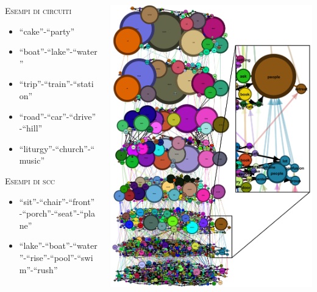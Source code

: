 \begin{minipage}[t]{\textwidth}
    \vspace{-0.4cm}
    \begin{columns}
    \begin{column}{0.33\textwidth}
        {\color{orangeUnicam} \scshape \small Esempi di circuiti}
        {\tiny
        \begin{itemize}
            \item “cake”-“party”
            \item “boat”-“lake”-“water”
            \item “trip”-“train”-“station”
            \item “road”-“car”-“drive”-“hill”
            \item “liturgy”-“church”-“music”
        \end{itemize}}
        \medskip
        {\color{orangeUnicam} \scshape \small Esempi di scc}
        {\tiny
        \begin{itemize}
            \item “sit”-“chair”-“front”-“porch”-“seat”-“plane”
            \item “lake”-“boat”-“water”-“rise”-“pool”-“swim”-“rush”
        \end{itemize}}
    \end{column}
    \hfill
    \begin{column}{0.66\textwidth}
        \includegraphics[height=0.85\textheight]{immagini/grafo_ml_focus}

\end{column}
\end{columns}
\end{minipage}
